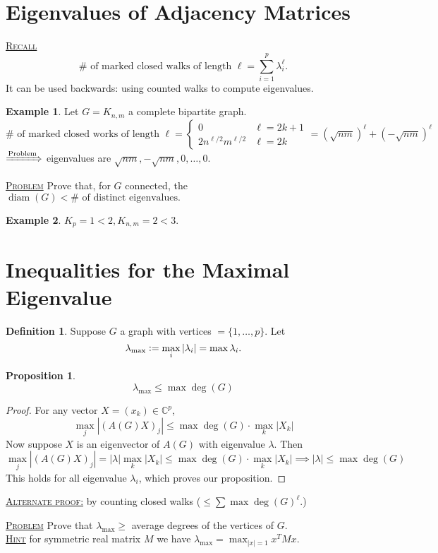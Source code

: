 \documentclass{report}
\newcommand{\C}{\mathbb{C}}
\def \diam {\operatorname{diam}}
\newcommand{\defeq}{\vcentcolon=}
\newcommand{\fancyem}[1]{\underline{\textsc{#1}}}
\newtheorem{proposition}{Proposition}[section]
\theoremstyle{definition}
\newtheorem{definition}{Definition}[section]
\newtheorem{example}{Example}[section]
\theoremstyle{remark}
\numberwithin{equation}{section}
\begin{document}
\section{Eigenvalues of Adjacency Matrices}
\fancyem{Recall}
\[\# \text{ of marked closed walks of length } \ell = \sum_{i=1}^p \lambda_i^\ell.\]
It can be used backwards: using counted walks to compute eigenvalues.

\begin{example}
Let $G = K_{n, m}$ a complete bipartite graph. 
\[\# \text{ of marked closed works of length } \ell = \begin{cases}
0 & \ell = 2k + 1 \\
2n^{\ell/2}m^{\ell/2} & \ell = 2k
\end{cases} = (\sqrt{nm})^\ell + (-\sqrt{nm})^{\ell}
\]
$\xRightarrow[]{\text{Problem}}$ eigenvalues are $\sqrt{nm}, -\sqrt{nm}, 0, \ldots, 0.$
\end{example}

\fancyem{Problem} Prove that, for $G$ connected, the $\diam(G) < \# \text{ of distinct eigenvalues}.$

\begin{example}
$K_p = 1 < 2, K_{n, m} = 2 < 3.$
\end{example}

\section{Inequalities for the Maximal Eigenvalue}
\begin{definition}
Suppose $G$ a graph with vertices $= \{1, \ldots, p\}.$ Let
\[\lambda_{\max} \defeq \max_i|\lambda_i| = \max \lambda_i.\]
\end{definition}

\begin{proposition}
\[\lambda_{\max} \leq \max \deg(G)\]
\end{proposition}
\begin{proof}
For any vector $X = (x_k) \in \C^p$,
\[
\max_j|(A(G)X)_j| \leq \max \deg(G) \cdot \max_k|X_k|
\]
Now suppose $X$ is an eigenvector of $A(G)$ with eigenvalue $\lambda$. Then
\[
\max_j|(A(G)X)_j| = |\lambda| \max_k|X_k| \leq \max \deg(G) \cdot \max_k|X_k| \implies |\lambda| \leq \max \deg(G)
\]
This holds for all eigenvalue $\lambda_i$, which proves our proposition.
\end{proof}
\fancyem{Alternate proof:} by counting closed walks ($\leq \sum \max\deg(G)^\ell$.)

\fancyem{Problem} Prove that $\lambda_{\max} \geq $ average degrees of the vertices of $G$.\\
\fancyem{Hint} for symmetric real matrix $M$ we have $\lambda_{\max} = \max_{|x| = 1} x^{T}Mx.$
\end{document}
